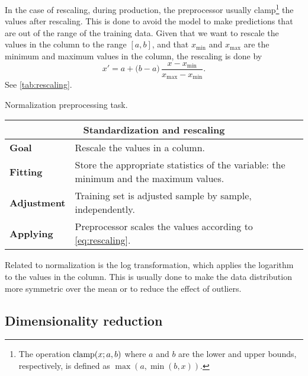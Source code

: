 In the case of rescaling, during production, the preprocessor usually clamp\footnote{The
operation $\operatorname{clamp}(x; a, b)$ where $a$ and $b$ are the lower and upper bounds,
respectively, is defined as $\max(a, \min(b, x))$.} the values after rescaling.  This is
done to avoid the model to make predictions that are out of the range of the training
data.  Given that we want to rescale the values in the column to the range $[a, b]$, and
that $x_\text{min}$ and $x_\text{max}$ are the minimum and maximum values in the column,
the rescaling is done by
\begin{equation}
  \label{eq:rescaling}
  x' = a + \big(b - a\big) \, \frac{x - x_\text{min}}{x_\text{max} - x_\text{min}}\text{.}
\end{equation}
See \cref{tab:rescaling}.

\begin{tablebox}[label=tab:rescaling]{Normalization preprocessing task.}
  \centering
  \begin{tabular}{lp{6cm}}
    \toprule
    \multicolumn{2}{c}{\textbf{Standardization and rescaling}} \\
    \midrule
    \textbf{Goal} &
      Rescale the values in a column. \\
    \textbf{Fitting} &
      Store the appropriate statistics of the variable: the minimum and the maximum
      values. \\
    \textbf{Adjustment} &
      Training set is adjusted sample by sample, independently. \\
    \textbf{Applying} &
      Preprocessor scales the values according to \cref{eq:rescaling}. \\
    \bottomrule
  \end{tabular}
\end{tablebox}

Related to normalization is the log transformation, which applies the logarithm to the
values in the column.  This is usually done to make the data distribution more symmetric
over the mean or to reduce the effect of outliers.


\subsection{Dimensionality reduction}

